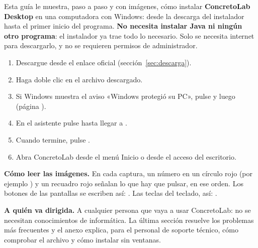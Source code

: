 Esta guía le muestra, paso a paso y con imágenes, cómo instalar \textbf{ConcretoLab Desktop} en una computadora con
Windows: desde la descarga del instalador hasta el primer inicio del programa. \textbf{No necesita instalar Java ni
ningún otro programa}: el instalador ya trae todo lo necesario. Solo se necesita internet para descargarlo, y no se
requieren permisos de administrador.

\begin{nota}
\begin{enumerate}
	\item Descargue \ruta{\archivoinstalador} desde el enlace oficial (sección~\ref{sec:descarga}).
	\item Haga doble clic en el archivo descargado.
	\item Si Windows muestra el aviso «Windows protegió su PC», pulse  y luego
	       (página \pageref{sec:smartscreen}).
	\item En el asistente pulse  hasta llegar a .
	\item Cuando termine, pulse .
	\item Abra ConcretoLab desde el menú Inicio o desde el acceso del escritorio.
\end{enumerate}
\end{nota}

\textbf{Cómo leer las imágenes.} En cada captura, un número en un círculo rojo (por ejemplo ) y un recuadro rojo
señalan lo que hay que pulsar, en ese orden. Los botones de las pantallas se escriben así: . Las teclas
del teclado, así: .

\textbf{A quién va dirigida.} A cualquier persona que vaya a usar ConcretoLab: no se necesitan conocimientos de
informática. La última sección resuelve los problemas más frecuentes y el anexo explica, para el personal de soporte
técnico, cómo comprobar el archivo y cómo instalar sin ventanas.
